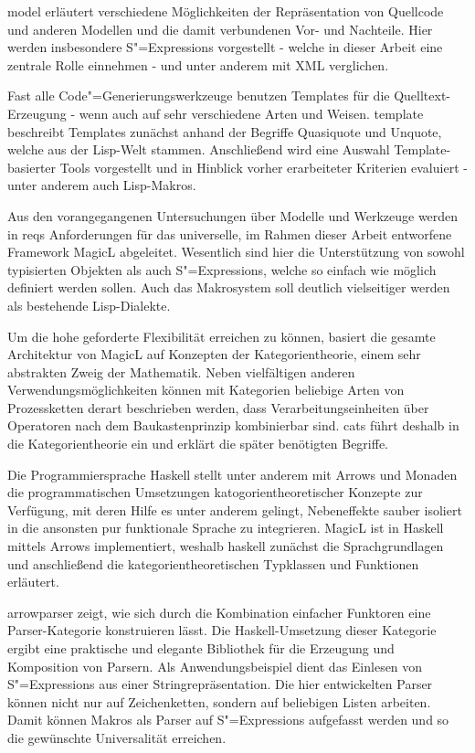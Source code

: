 \documentclass[11pt, a4paper, bibgerm]{scrbook}
\newcommand\cref{}
\newcommand{\sexps}{S"=Expressions}
\newcommand{\cgen}{Code"=Generierung}
\begin{document}
\cref{model} erläutert verschiedene Möglichkeiten der Repräsentation von
Quellcode und anderen Modellen und die damit verbundenen Vor- und
Nachteile. Hier werden insbesondere \sexps{} vorgestellt - welche in
dieser Arbeit eine zentrale Rolle einnehmen - und unter anderem mit XML
verglichen.

Fast alle \cgen{}swerkzeuge benutzen Templates für die
Quelltext-Erzeugung - wenn auch auf sehr verschiedene Arten und
Weisen. \cref{template} beschreibt Templates zunächst anhand der
Begriffe Quasiquote und Unquote, welche aus der Lisp-Welt
stammen. Anschließend wird eine Auswahl Template-basierter Tools
vorgestellt und in Hinblick vorher erarbeiteter Kriterien evaluiert -
unter anderem auch Lisp-Makros.

Aus den vorangegangenen Untersuchungen über Modelle und Werkzeuge werden
in \cref{reqs} Anforderungen für das universelle, im Rahmen dieser
Arbeit entworfene Framework MagicL abgeleitet. Wesentlich sind hier die
Unterstützung von sowohl typisierten Objekten als auch \sexps{}, welche
so einfach wie möglich definiert werden sollen. Auch das Makrosystem
soll deutlich vielseitiger werden als bestehende Lisp-Dialekte.

Um die hohe geforderte Flexibilität erreichen zu können, basiert die
gesamte Architektur von MagicL auf Konzepten der Kategorientheorie,
einem sehr abstrakten Zweig der Mathematik. Neben vielfältigen anderen
Verwendungsmöglichkeiten können mit Kategorien beliebige Arten von
Prozessketten derart beschrieben werden, dass Verarbeitungseinheiten
über Operatoren nach dem Baukastenprinzip kombinierbar sind. \cref{cats}
führt deshalb in die Kategorientheorie ein und erklärt die später
benötigten Begriffe.

Die Programmiersprache Haskell stellt unter anderem mit Arrows und
Monaden die programmatischen Umsetzungen katogorientheoretischer
Konzepte zur Verfügung, mit deren Hilfe es unter anderem gelingt,
Nebeneffekte sauber isoliert in die ansonsten pur funktionale Sprache zu
integrieren. MagicL ist in Haskell mittels Arrows implementiert, weshalb
\cref{haskell} zunächst die Sprachgrundlagen und anschließend die
kategorientheoretischen Typklassen und Funktionen erläutert.

\cref{arrowparser} zeigt, wie sich durch die Kombination einfacher
Funktoren eine Parser-Kategorie konstruieren lässt. Die
Haskell-Umsetzung dieser Kategorie ergibt eine praktische und elegante
Bibliothek für die Erzeugung und Komposition von Parsern. Als
Anwendungsbeispiel dient das Einlesen von \sexps{} aus einer
Stringrepräsentation. Die hier entwickelten Parser können nicht nur auf
Zeichenketten, sondern auf beliebigen Listen arbeiten. Damit können
Makros als Parser auf \sexps{} aufgefasst werden und so die
gewünschte Universalität erreichen.
\end{document}
